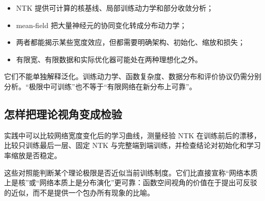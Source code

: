 \begin{itemize}
\tightlist
\item NTK 提供可计算的核基线、局部训练动力学和部分收敛分析；
\item mean-field 把大量神经元的协同变化转成分布动力学；
\item 两者都能揭示某些宽度效应，但都需要明确架构、初始化、缩放和损失；
\item 有限宽、有限数据和实际优化器可能处在两种理想化之外。
\end{itemize}

它们不能单独解释泛化。训练动力学、函数复杂度、数据分布和评价协议仍需分别分析。``极限中可训练''也不等于``有限网络在新分布上可靠''。

\subsection{怎样把理论视角变成检验}

实践中可以比较网络宽度变化后的学习曲线，测量经验 NTK 在训练前后的漂移，比较只训练最后一层、固定 NTK 与完整端到端训练，并检查结论对初始化和学习率缩放是否稳定。

这些对照能判断某个理论极限是否近似当前训练制度。它们比直接宣称``网络本质上是核''或``网络本质上是分布演化''更可靠：函数空间视角的价值在于提出可反驳的近似，而不是提供一个包办所有现象的比喻。
